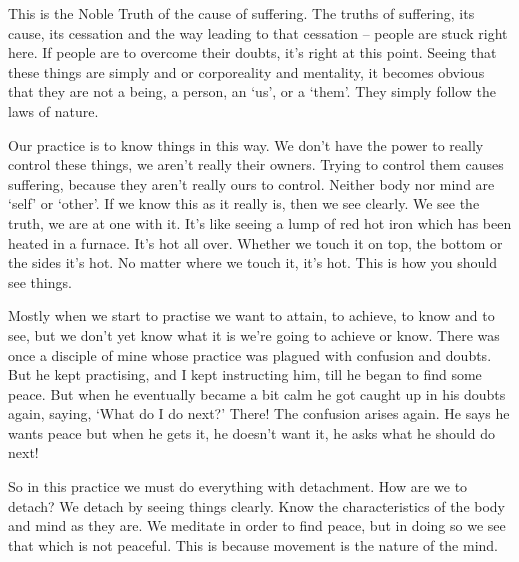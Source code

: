 This is the Noble Truth of the cause of suffering. The truths of suffering, its cause, its cessation and the way leading to that cessation -- people are stuck right here. If people are to overcome their doubts, it's right at this point. Seeing that these things are simply  and  or corporeality and mentality, it becomes obvious that they are not a being, a person, an `us', or a `them'. They simply follow the laws of nature. 

Our practice is to know things in this way. We don't have the power to really control these things, we aren't really their owners. Trying to control them causes suffering, because they aren't really ours to control. Neither body nor mind are `self' or `other'. If we know this as it really is, then we see clearly. We see the truth, we are at one with it. It's like seeing a lump of red hot iron which has been heated in a furnace. It's hot all over. Whether we touch it on top, the bottom or the sides it's hot. No matter where we touch it, it's hot. This is how you should see things. 

Mostly when we start to practise we want to attain, to achieve, to know and to see, but we don't yet know what it is we're going to achieve or know. There was once a disciple of mine whose practice was plagued with confusion and doubts. But he kept practising, and I kept instructing him, till he began to find some peace. But when he eventually became a bit calm he got caught up in his doubts again, saying, `What do I do next?' There! The confusion arises again. He says he wants peace but when he gets it, he doesn't want it, he asks what he should do next! 

So in this practice we must do everything with detachment. How are we to detach? We detach by seeing things clearly. Know the characteristics of the body and mind as they are. We meditate in order to find peace, but in doing so we see that which is not peaceful. This is because movement is the nature of the mind. 

